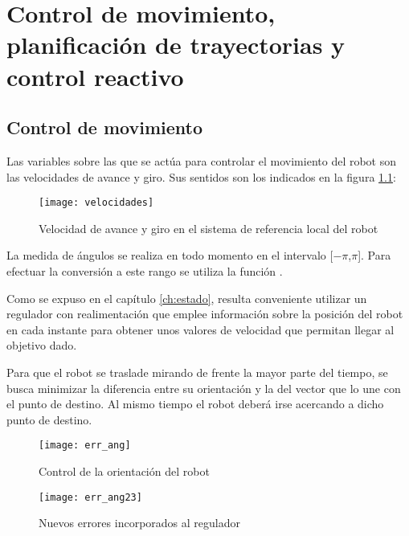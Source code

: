 
\chapter[Control de movimiento]
{Control de movimiento, planificación de trayectorias y control reactivo}%
\label{ch:movimiento}

\section{Control de movimiento}\label{control}

Las variables sobre las que se actúa para controlar el movimiento del robot son las velocidades de avance y giro. Sus sentidos son los indicados en la figura \ref{fg:velocidades}:

\begin{figure}[hbt]
  \centering\texttt{[image: velocidades]}\\
  \caption{Velocidad de avance y giro en el sistema de referencia local del robot}\label{fg:velocidades}
\end{figure}


La medida de ángulos se realiza en todo momento en el intervalo [$-\pi$,$\pi$]. Para efectuar la conversión a este rango se utiliza la función .

Como se expuso en el capítulo \ref{ch:estado}, resulta conveniente utilizar un regulador con realimentación que emplee información sobre la posición del robot en cada instante para obtener unos valores de velocidad que permitan llegar al objetivo dado.

Para que el robot se traslade mirando de frente la mayor parte del tiempo, se busca minimizar la diferencia entre su orientación y la del vector que lo une con el punto de destino. Al mismo tiempo el robot deberá irse acercando a dicho punto de destino.

\begin{figure}[bt]
  \centering\texttt{[image: err\_ang]}\\
  \caption{Control de la orientación del robot}\label{fg:err_ang}
\end{figure}

\begin{figure}[bt]
  \centering\texttt{[image: err\_ang23]}\\
  \caption{Nuevos errores incorporados al regulador}\label{fg:err_ang23}
\end{figure} 


